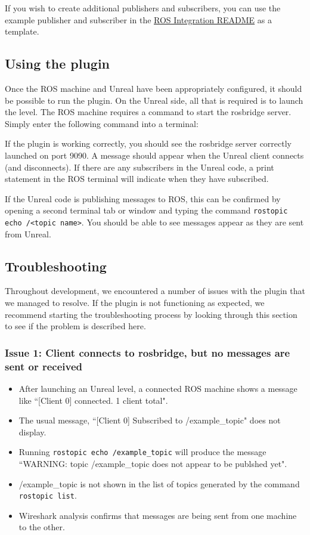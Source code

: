\documentclass[../main.tex]{subfiles}
\begin{document}
If you wish to create additional publishers and subscribers, you can use the example publisher and subscriber in the \href{https://github.com/code-iai/ROSIntegration#rosintegration-plugin-for-unreal-engine-4}{\underline{ROS Integration README}} as a template. 

\subsection{Using the plugin}
Once the ROS machine and Unreal have been appropriately configured, it should be possible to run the plugin. On the Unreal side, all that is required is to launch the level. The ROS machine requires a command to start the rosbridge server. Simply enter the following command into a terminal:

If the plugin is working correctly, you should see the rosbridge server correctly launched on port 9090. A message should appear when the Unreal client connects (and disconnects). If there are any subscribers in the Unreal code, a print statement in the ROS terminal will indicate when they have subscribed. 

If the Unreal code is publishing messages to ROS, this can be confirmed by opening a second terminal tab or window and typing the command \texttt{rostopic echo /<topic name>}. You should be able to see messages appear as they are sent from Unreal. 

\subsection{Troubleshooting} \label{sec:troubleshooting}
Throughout development, we encountered a number of issues with the plugin that we managed to resolve. If the plugin is not functioning as expected, we recommend starting the troubleshooting process by looking through this section to see if the problem is described here.

\subsubsection{Issue 1: Client connects to rosbridge, but no messages are sent or received} \label{sec:no_messages_issue}
\begin{itemize}
    \item After launching an Unreal level, a connected ROS machine shows a message like ``[Client 0] connected. 1 client total". 
    \item The usual message, ``[Client 0] Subscribed to /example\_topic" does not display.
    \item Running \texttt{rostopic echo /example\_topic} will produce the message ``WARNING: topic /example\_topic does not appear to be publshed yet".
    \item /example\_topic is not shown in the list of topics generated by the command \texttt{rostopic list}. 
    \item Wireshark analysis confirms that messages are being sent from one machine to the other.
\end{itemize}
\end{document}
